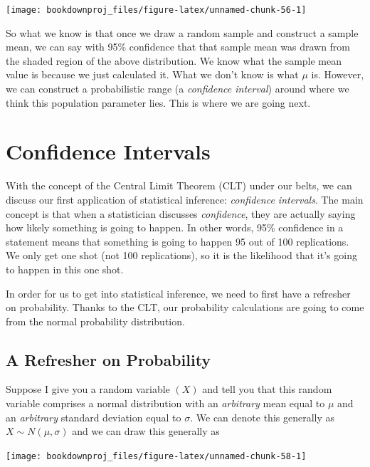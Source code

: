 \documentclass[
]{book}
\begin{document}
\begin{center}\texttt{[image: bookdownproj\_files/figure-latex/unnamed-chunk-56-1]} \end{center}

So what we know is that once we draw a random sample and construct a sample mean, we can say with 95\% confidence that that sample mean was drawn from the shaded region of the above distribution. We know what the sample mean value is because we just calculated it. What we don't know is what \(\mu\) is. However, we can construct a probabilistic range (a \emph{confidence interval}) around where we think this population parameter lies. This is where we are going next.

\hypertarget{CI}{%
\chapter{Confidence Intervals}\label{CI}}

With the concept of the Central Limit Theorem (CLT) under our belts, we can discuss our first application of statistical inference: \emph{confidence intervals}. The main concept is that when a statistician discusses \emph{confidence}, they are actually saying how likely something is going to happen. In other words, 95\% confidence in a statement means that something is going to happen 95 out of 100 replications. We only get one shot (not 100 replications), so it is the likelihood that it's going to happen in this one shot.

In order for us to get into statistical inference, we need to first have a refresher on probability. Thanks to the CLT, our probability calculations are going to come from the normal probability distribution.

\hypertarget{a-refresher-on-probability}{%
\section{A Refresher on Probability}\label{a-refresher-on-probability}}

Suppose I give you a random variable \((X)\) and tell you that this random variable comprises a normal distribution with an \emph{arbitrary} mean equal to \(\mu\) and an \emph{arbitrary} standard deviation equal to \(\sigma\). We can denote this generally as \(X \sim N(\mu,\sigma)\) and we can draw this generally as

\begin{center}\texttt{[image: bookdownproj\_files/figure-latex/unnamed-chunk-58-1]} \end{center}
\end{document}
